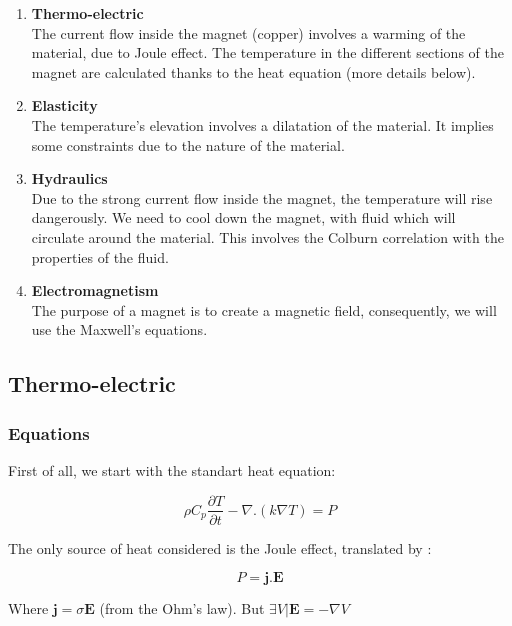 \documentclass[11pt]{amsart}
\begin{document}
\begin{enumerate}

\item{\textbf{Thermo-electric} \\
The current flow inside the magnet (copper) involves a warming of the material, due to Joule effect.
The temperature in the different sections of the magnet are calculated thanks to the heat equation (more details below).}

\item{\textbf{Elasticity} \\
The temperature’s elevation involves a dilatation of the material. It implies some constraints due to the nature of the material.}

\item{\textbf{Hydraulics} \\
Due to the strong current flow inside the magnet, the temperature will rise dangerously.
We need to cool down the magnet, with fluid which will circulate around the material.
This involves the Colburn correlation with the properties of the fluid.}

\item{\textbf{Electromagnetism} \\
The purpose of a magnet is to create a magnetic field, consequently, we will use the Maxwell’s equations.}

\end{enumerate}


\hypertarget{x-thermo-electric}{\subsection{Thermo-electric}}
\hypertarget{x-equations}{\subsubsection{Equations}}
First of all, we start with the standart heat equation:



\[
\rho C_{p}\frac{\partial T}{\partial t} - \nabla.(k \nabla T)=P
\]



The only source of heat considered is the Joule effect, translated by :



\[
P=\textbf{j.E}
\]



Where $\textbf{j}=\sigma\textbf{E}$  (from the Ohm’s law).
But $\exists V | \textbf{E}=-\nabla V$
\end{document}

